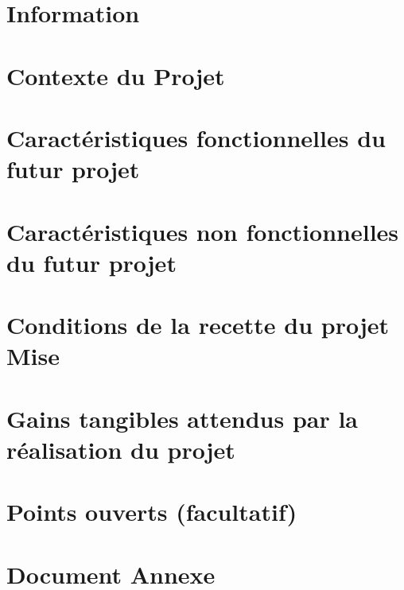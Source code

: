\documentclass[a4paper,12pt]{report} %
\begin{document}
		
		
		
	
	\tableofcontents %
	\thispagestyle{empty}
	\setcounter{page}{0}
	\newpage %
	
	
	\part{Information}
	
	\part{Contexte du Projet}
	
	\part{Caractéristiques fonctionnelles du futur projet}
	
	
	\part{Caractéristiques non fonctionnelles du futur projet}
	
	\part{Conditions de la recette du projet Mise} %
	
	\part{Gains tangibles attendus par la réalisation du projet}
	
	\part{Points ouverts (facultatif)}
	
	\part{Document Annexe}
\end{document}
